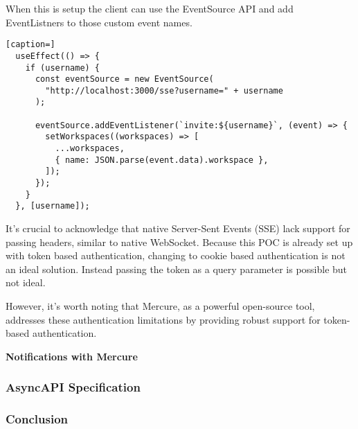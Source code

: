 When this is setup the client can use the EventSource API and add EventListners to those custom event names.

\begin{lstlisting}[caption=]
  useEffect(() => {
    if (username) {
      const eventSource = new EventSource(
        "http://localhost:3000/sse?username=" + username
      );
 
      eventSource.addEventListener(`invite:${username}`, (event) => {
        setWorkspaces((workspaces) => [
          ...workspaces,
          { name: JSON.parse(event.data).workspace },
        ]);
      });
    }
  }, [username]);
\end{lstlisting}

It's crucial to acknowledge that native Server-Sent Events (SSE) lack support for passing headers, similar to native WebSocket. Because this POC is already set up with token based authentication, changing to cookie based authentication is not an ideal solution. Instead passing the token as a query parameter is possible but not ideal.

However, it's worth noting that Mercure, as a powerful open-source tool, addresses these authentication limitations by providing robust support for token-based authentication. 

\textbf{Notifications with Mercure}

\subsubsection{AsyncAPI Specification}



\subsubsection{Conclusion}

